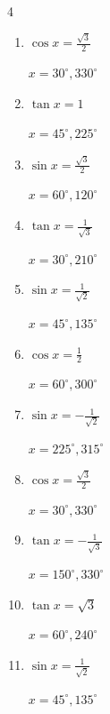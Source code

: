 \begin{multicols}{4}
\begin{enumerate}
  \item $\displaystyle \cos{x}  = \frac{\sqrt{3}}{2}$

        $\displaystyle x = 30^{\circ} , 330^{\circ}$

  \item $\displaystyle \tan{x}  = 1$

        $\displaystyle x = 45^{\circ} , 225^{\circ}$

  \item $\displaystyle \sin{x}  = \frac{\sqrt{3}}{2}$

        $\displaystyle x = 60^{\circ} , 120^{\circ}$

  \item $\displaystyle \tan{x}  = \frac{1}{\sqrt{3}}$

        $\displaystyle x = 30^{\circ} , 210^{\circ}$

  \item $\displaystyle \sin{x}  = \frac{1}{\sqrt{2}}$

        $\displaystyle x = 45^{\circ} , 135^{\circ}$

  \item $\displaystyle \cos{x}  = \frac{1}{2}$

        $\displaystyle x = 60^{\circ} , 300^{\circ}$

  \item $\displaystyle \sin{x}  = -\frac{1}{\sqrt{2}}$

        $\displaystyle x = 225^{\circ} , 315^{\circ}$

  \item $\displaystyle \cos{x}  = \frac{\sqrt{3}}{2}$

        $\displaystyle x = 30^{\circ} , 330^{\circ}$

\columnbreak %

\resetques

  \item $\displaystyle \tan{x}  = -\frac{1}{\sqrt{3}}$

        $\displaystyle x = 150^{\circ} , 330^{\circ}$

  \item $\displaystyle \tan{x}  = \sqrt{3}$

        $\displaystyle x = 60^{\circ} , 240^{\circ}$

  \item $\displaystyle \sin{x}  = \frac{1}{\sqrt{2}}$

        $\displaystyle x = 45^{\circ} , 135^{\circ}$


\end{enumerate}
\end{multicols}
